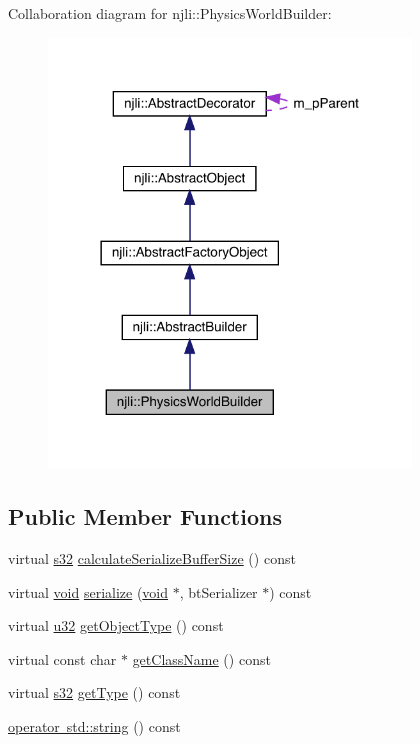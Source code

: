 Collaboration diagram for njli\+:\+:Physics\+World\+Builder\+:\nopagebreak
\begin{figure}[H]
\begin{center}
\leavevmode
\includegraphics[width=273pt]{classnjli_1_1_physics_world_builder__coll__graph}
\end{center}
\end{figure}
\subsection*{Public Member Functions}
\begin{DoxyCompactItemize}
\item 
virtual \mbox{\hyperlink{_util_8h_aa62c75d314a0d1f37f79c4b73b2292e2}{s32}} \mbox{\hyperlink{classnjli_1_1_physics_world_builder_a60de0aef2cb32a819856a009a07d7211}{calculate\+Serialize\+Buffer\+Size}} () const
\item 
virtual \mbox{\hyperlink{_thread_8h_af1e856da2e658414cb2456cb6f7ebc66}{void}} \mbox{\hyperlink{classnjli_1_1_physics_world_builder_a795847019f3bea770fcd58c2e3225e7c}{serialize}} (\mbox{\hyperlink{_thread_8h_af1e856da2e658414cb2456cb6f7ebc66}{void}} $\ast$, bt\+Serializer $\ast$) const
\item 
virtual \mbox{\hyperlink{_util_8h_a10e94b422ef0c20dcdec20d31a1f5049}{u32}} \mbox{\hyperlink{classnjli_1_1_physics_world_builder_a665a6db3345d1cfcdf2ea8cca2baa20e}{get\+Object\+Type}} () const
\item 
virtual const char $\ast$ \mbox{\hyperlink{classnjli_1_1_physics_world_builder_ab046eaf50c425ccf120a4bd6f8702fe0}{get\+Class\+Name}} () const
\item 
virtual \mbox{\hyperlink{_util_8h_aa62c75d314a0d1f37f79c4b73b2292e2}{s32}} \mbox{\hyperlink{classnjli_1_1_physics_world_builder_a0286fa01f8adc2fd7b71f6e3a2f0bb31}{get\+Type}} () const
\item 
\mbox{\hyperlink{classnjli_1_1_physics_world_builder_ada0b9e51b166170d7c3a90d81b2bbe55}{operator std\+::string}} () const
\end{DoxyCompactItemize}
